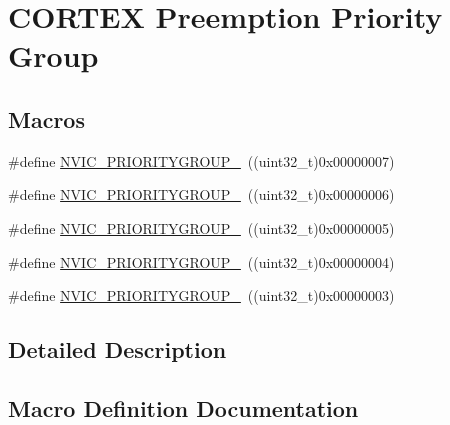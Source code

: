 \hypertarget{group___c_o_r_t_e_x___preemption___priority___group}{}\section{C\+O\+R\+T\+EX Preemption Priority Group}
\label{group___c_o_r_t_e_x___preemption___priority___group}
\subsection*{Macros}
\begin{DoxyCompactItemize}
\item 
\#define \hyperlink{group___c_o_r_t_e_x___preemption___priority___group_ga5e97dcff77680602c86e44f23f5ffa1a}{N\+V\+I\+C\+\_\+\+P\+R\+I\+O\+R\+I\+T\+Y\+G\+R\+O\+U\+P\+\_}~((uint32\+\_\+t)0x00000007)
\item 
\#define \hyperlink{group___c_o_r_t_e_x___preemption___priority___group_ga702227137b010421c3a3b6434005a132}{N\+V\+I\+C\+\_\+\+P\+R\+I\+O\+R\+I\+T\+Y\+G\+R\+O\+U\+P\+\_}~((uint32\+\_\+t)0x00000006)
\item 
\#define \hyperlink{group___c_o_r_t_e_x___preemption___priority___group_gaa43a3fd37850c120ce567ab2743d11b4}{N\+V\+I\+C\+\_\+\+P\+R\+I\+O\+R\+I\+T\+Y\+G\+R\+O\+U\+P\+\_}~((uint32\+\_\+t)0x00000005)
\item 
\#define \hyperlink{group___c_o_r_t_e_x___preemption___priority___group_ga8ddb24962e6f0fc3273139d45d374b09}{N\+V\+I\+C\+\_\+\+P\+R\+I\+O\+R\+I\+T\+Y\+G\+R\+O\+U\+P\+\_}~((uint32\+\_\+t)0x00000004)
\item 
\#define \hyperlink{group___c_o_r_t_e_x___preemption___priority___group_gae6eab9140204bc938255aa148e597c45}{N\+V\+I\+C\+\_\+\+P\+R\+I\+O\+R\+I\+T\+Y\+G\+R\+O\+U\+P\+\_}~((uint32\+\_\+t)0x00000003)
\end{DoxyCompactItemize}


\subsection{Detailed Description}


\subsection{Macro Definition Documentation}
